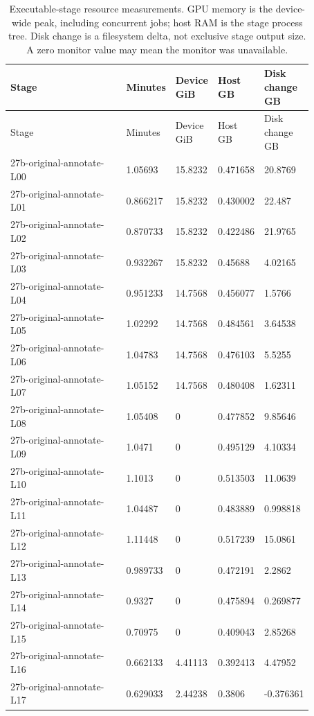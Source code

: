 \begin{longtable}{@{}L{0.39\linewidth}L{0.11\linewidth}L{0.12\linewidth}L{0.12\linewidth}L{0.13\linewidth}@{}}
\caption{Executable-stage resource measurements. GPU memory is the device-wide peak, including concurrent jobs; host RAM is the stage process tree. Disk change is a filesystem delta, not exclusive stage output size. A zero monitor value may mean the monitor was unavailable.}\\
\toprule
Stage & Minutes & Device GiB & Host GB & Disk change GB \\
\midrule
\endfirsthead
\toprule
Stage & Minutes & Device GiB & Host GB & Disk change GB \\
\midrule
\endhead
\endfoot
\bottomrule
\endlastfoot
27b-original-annotate-L00 & 1.05693 & 15.8232 & 0.471658 & 20.8769 \\
27b-original-annotate-L01 & 0.866217 & 15.8232 & 0.430002 & 22.487 \\
27b-original-annotate-L02 & 0.870733 & 15.8232 & 0.422486 & 21.9765 \\
27b-original-annotate-L03 & 0.932267 & 15.8232 & 0.45688 & 4.02165 \\
27b-original-annotate-L04 & 0.951233 & 14.7568 & 0.456077 & 1.5766 \\
27b-original-annotate-L05 & 1.02292 & 14.7568 & 0.484561 & 3.64538 \\
27b-original-annotate-L06 & 1.04783 & 14.7568 & 0.476103 & 5.5255 \\
27b-original-annotate-L07 & 1.05152 & 14.7568 & 0.480408 & 1.62311 \\
27b-original-annotate-L08 & 1.05408 & 0 & 0.477852 & 9.85646 \\
27b-original-annotate-L09 & 1.0471 & 0 & 0.495129 & 4.10334 \\
27b-original-annotate-L10 & 1.1013 & 0 & 0.513503 & 11.0639 \\
27b-original-annotate-L11 & 1.04487 & 0 & 0.483889 & 0.998818 \\
27b-original-annotate-L12 & 1.11448 & 0 & 0.517239 & 15.0861 \\
27b-original-annotate-L13 & 0.989733 & 0 & 0.472191 & 2.2862 \\
27b-original-annotate-L14 & 0.9327 & 0 & 0.475894 & 0.269877 \\
27b-original-annotate-L15 & 0.70975 & 0 & 0.409043 & 2.85268 \\
27b-original-annotate-L16 & 0.662133 & 4.41113 & 0.392413 & 4.47952 \\
27b-original-annotate-L17 & 0.629033 & 2.44238 & 0.3806 & -0.376361 \\

\end{longtable}
